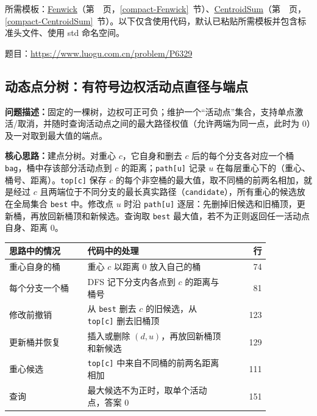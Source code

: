 所需模板：\hyperref[compact-Fenwick]{Fenwick}（第~\pageref{compact-Fenwick}~页，\ref{compact-Fenwick}~节）、\hyperref[compact-CentroidSum]{CentroidSum}（第~\pageref{compact-CentroidSum}~页，\ref{compact-CentroidSum}~节）。以下仅含使用代码，默认已粘贴所需模板并包含标准头文件、使用 std 命名空间。

题目：\url{https://www.luogu.com.cn/problem/P6329}



\subsection{动态点分树：有符号边权活动点直径与端点}\label{compact-CentroidDiameter}

\noindent\textbf{问题描述：}\allowbreak 固定的一棵树，边权可正可负；维护一个“活动点”集合，支持单点激活/取消，并随时查询活动点之间的最大路径权值（允许两端为同一点，此时为 0）及一对取到最大值的端点。

\textbf{核心思路：}\allowbreak 建点分树。对重心 $c$，它自身和删去 $c$ 后的每个分支各对应一个桶 \texttt{bag}，桶中存该部分活动点到 $c$ 的距离；\texttt{path[u]} 记录 $u$ 在每层重心下的（重心、桶号、距离）。\texttt{top[c]} 保存 $c$ 的每个非空桶的最大值，取不同桶的前两名相加，就是经过 $c$ 且两端位于不同分支的最长真实路径（\texttt{candidate}），所有重心的候选放在全局集合 \texttt{best} 中。修改点 $u$ 时沿 \texttt{path[u]} 逐层：先删掉旧候选和旧桶顶，更新桶，再放回新桶顶和新候选。查询取 \texttt{best} 最大值，若不为正则返回任一活动点自身、距离 0。

\begin{center}\small
\begin{tabular}{@{}p{0.30\linewidth}p{0.55\linewidth}r@{}}
\toprule
思路中的情况 & 代码中的处理 & 行\\
\midrule
重心自身的桶 & 重心 $c$ 以距离 0 放入自己的桶 & 74\\
每个分支一个桶 & DFS 记下分支内各点到 $c$ 的距离与桶号 & 81\\
修改前撤销 & 从 \texttt{best} 删去 $c$ 的旧候选，从 \texttt{top[c]} 删去旧桶顶 & 123\\
更新桶并恢复 & 插入或删除 $(d,u)$，再放回新桶顶和新候选 & 129\\
重心候选 & \texttt{top[c]} 中来自不同桶的前两名距离相加 & 111\\
查询 & 最大候选不为正时，取单个活动点，答案 0 & 151\\
\bottomrule
\end{tabular}
\end{center}



